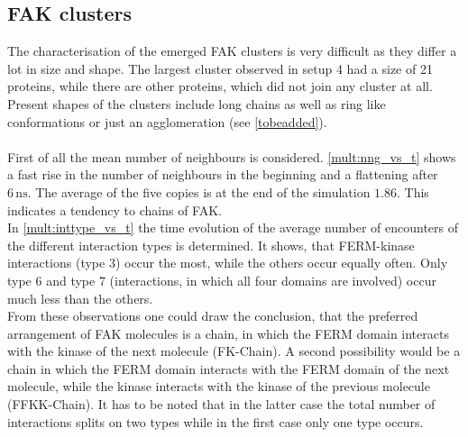 \subsection{FAK clusters}
\label{mult:oligs}
The characterisation of the emerged FAK clusters is very difficult as they differ a lot in size and shape. The largest cluster observed in setup 4 had a size of 21 proteins, while there are other proteins, which did not join any cluster at all. Present shapes of the clusters include long chains as well as ring like conformations or just an agglomeration (see \autoref{tobeadded}). \\
\\
First of all the mean number of neighbours is considered. \autoref{mult:nng_vs_t} shows a fast rise in the number of neighbours in the beginning and a flattening after $6\,\si{\nano\second}$. The average of the five copies is at the end of the simulation $1.86$. This indicates a tendency to chains of FAK.\\
In \autoref{mult:inttype_vs_t} the time evolution of the average number of encounters of the different interaction types is determined. It shows, that FERM-kinase interactions (type 3) occur the most, while the others occur equally often. Only type 6 and type 7 (interactions, in which all four domains are involved) occur much less than the others.\\
From these observations one could draw the conclusion, that the preferred arrangement of FAK molecules is a chain, in which the FERM domain interacts with the kinase of the next molecule (FK-Chain). A second possibility would be a chain in which the FERM domain interacts with the FERM domain of the next molecule, while the kinase interacts with the kinase of the previous molecule (FFKK-Chain). It has to be noted that in the latter case the total number of interactions splits on two types while in the first case only one type occurs.
%
%
%
